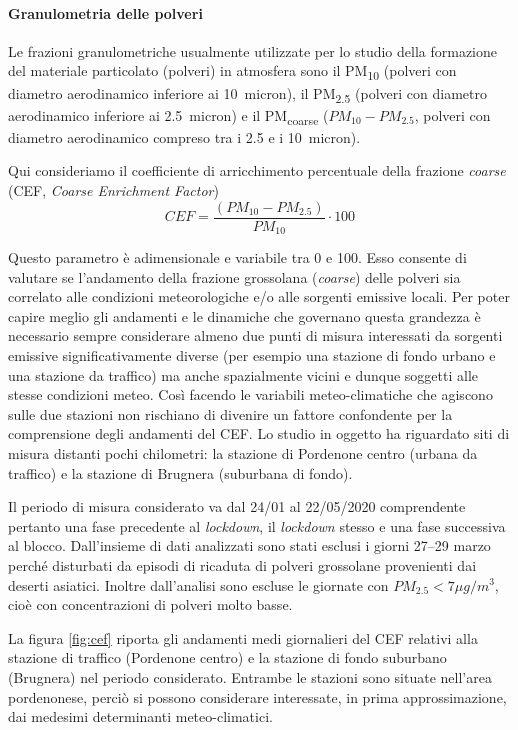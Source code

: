\FloatBarrier
\paragraph{Granulometria delle polveri}\label{cap:cef}

Le frazioni granulometriche usualmente utilizzate per lo studio della formazione del materiale particolato (polveri) in atmosfera sono il PM\textsubscript{10} (polveri con diametro aerodinamico inferiore ai 10~micron), il  PM\textsubscript{2.5} (polveri con diametro aerodinamico inferiore ai 2.5~micron) e il  PM\textsubscript{coarse} ($PM_{10}-PM_{2.5}$, polveri con diametro aerodinamico compreso tra i 2.5 e i 10~micron).

Qui consideriamo il coefficiente di arricchimento percentuale della frazione \textit{coarse} (CEF, \textit{Coarse Enrichment Factor}) 
$$CEF=\frac{(PM_{10}-PM_{2.5})}{PM_{10}} \cdot 100$$

Questo parametro è adimensionale e variabile tra 0 e 100. Esso consente di valutare se l'andamento della frazione grossolana (\textit{coarse}) delle polveri sia correlato alle condizioni meteorologiche e/o alle sorgenti emissive locali.
 Per poter capire meglio gli andamenti e le dinamiche che governano questa grandezza è necessario sempre considerare almeno due punti di misura interessati da sorgenti emissive significativamente diverse (per esempio una stazione di fondo urbano e una stazione da traffico) ma anche spazialmente vicini e dunque soggetti alle stesse condizioni meteo. Così facendo le variabili meteo-climatiche che agiscono sulle due stazioni non rischiano di divenire un fattore confondente per la comprensione degli andamenti del CEF.  
Lo studio in oggetto ha riguardato siti di misura distanti pochi chilometri:  la stazione di Pordenone centro (urbana da traffico) e la stazione di Brugnera (suburbana di fondo).

Il periodo di misura considerato va dal 24/01 al 22/05/2020 comprendente pertanto una fase precedente al \textit{lockdown}, il \textit{lockdown} stesso e una fase successiva al blocco.
Dall'insieme di dati analizzati sono stati esclusi i giorni 27--29 marzo perché disturbati da episodi di ricaduta  di polveri grossolane provenienti dai deserti asiatici.
Inoltre dall'analisi sono escluse le giornate con $PM_{2.5}<7 \mu g/m^3$, cioè con concentrazioni di polveri molto basse.

La figura \ref{fig:cef} riporta gli andamenti medi giornalieri del CEF relativi alla stazione di traffico (Pordenone centro)  e la stazione di fondo suburbano (Brugnera) nel periodo considerato. Entrambe le stazioni sono situate nell'area pordenonese, perciò si possono considerare interessate, in prima approssimazione, dai medesimi determinanti meteo-climatici. 

